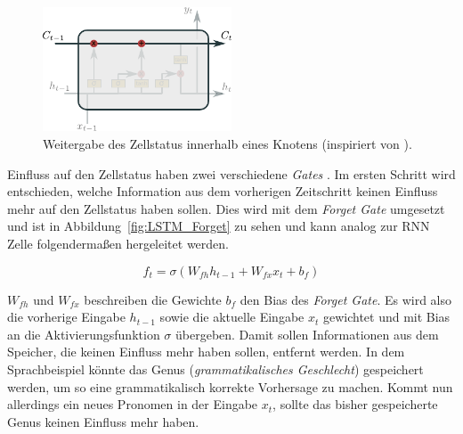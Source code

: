                     \begin{figure}[ht]
                        \centering
                        \includegraphics[width=0.5\textwidth]{images/Illustrationen/LSTM_MC}
                        \caption{Weitergabe des Zellstatus innerhalb eines Knotens (inspiriert von \cite{OLAH2015}).}
                        \label{fig:LSTM_Status}
                    \end{figure}
                    
                    Einfluss auf den Zellstatus haben zwei verschiedene \textit{Gates} .
                Im ersten Schritt wird entschieden, welche Information aus dem vorherigen Zeitschritt keinen Einfluss mehr auf den Zellstatus haben sollen.
                Dies wird mit dem \textit{Forget Gate} umgesetzt und ist in Abbildung~\ref{fig:LSTM_Forget} zu sehen und kann analog zur RNN Zelle folgendermaßen hergeleitet werden.

                \begin{equation}
                    f_t = \sigma\left(W_{fh}h_{t-1} + W_{fx}x_t + b_f\right)
                \end{equation}

                $W_{fh}$ und $W_{fx}$ beschreiben die Gewichte $b_f$ den Bias des \textit{Forget Gate}.
                Es wird also die vorherige Eingabe $h_{t-1}$ sowie die aktuelle Eingabe $x_t$ gewichtet und mit Bias an die Aktivierungsfunktion $\sigma$ übergeben.
                Damit sollen Informationen aus dem Speicher, die keinen Einfluss mehr haben sollen, entfernt werden.
                In dem Sprachbeispiel könnte das Genus (\textit{grammatikalisches Geschlecht}) gespeichert werden, um so eine grammatikalisch korrekte Vorhersage zu machen.
                Kommt nun allerdings ein neues Pronomen in der Eingabe $x_t$, sollte das bisher gespeicherte Genus keinen Einfluss mehr haben.
                
